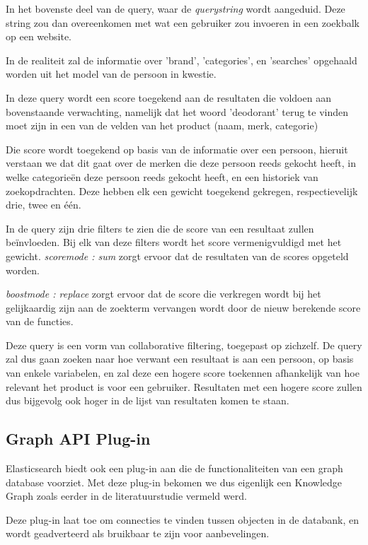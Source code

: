 In het bovenste deel van de query, waar de \textit{query\textunderscore string} wordt aangeduid. Deze string zou dan overeenkomen met wat een gebruiker zou invoeren in een zoekbalk op een website.

In de realiteit zal de informatie over 'brand', 'categories', en 'searches' opgehaald worden uit het model van de persoon in kwestie.

In deze query wordt een score toegekend aan de resultaten die voldoen aan bovenstaande verwachting, namelijk dat het woord 'deodorant' terug te vinden moet zijn in een van de velden van het product (naam, merk, categorie)

\newpage
Die score wordt toegekend op basis van de informatie over een persoon, hieruit verstaan we dat dit gaat over de merken die deze persoon reeds gekocht heeft, in welke categorieën deze persoon reeds gekocht heeft, en een historiek van zoekopdrachten. Deze hebben elk een gewicht toegekend gekregen, respectievelijk drie, twee en één. 

In de query zijn drie filters te zien die de score van een resultaat zullen beïnvloeden. Bij elk van deze filters wordt het score vermenigvuldigd met het gewicht. \textit{score\textunderscore mode : sum} zorgt ervoor dat de resultaten van de scores opgeteld worden.

\textit{boost\textunderscore mode : replace} zorgt ervoor dat de score die verkregen wordt bij het gelijkaardig zijn aan de zoekterm vervangen wordt door de nieuw berekende score van de functies.

Deze query is een vorm van collaborative filtering, toegepast op zichzelf. De query zal dus gaan zoeken naar hoe verwant een resultaat is aan een persoon, op basis van enkele variabelen, en zal deze een hogere score toekennen afhankelijk van hoe relevant het product is voor een gebruiker. Resultaten met een hogere score zullen dus bijgevolg ook hoger in de lijst van resultaten komen te staan.

\subsection{Graph API Plug-in}
\label{sec:Graph API Plug-in}

Elasticsearch biedt ook een plug-in aan die de functionaliteiten van een graph database voorziet. Met deze plug-in bekomen we dus eigenlijk een Knowledge Graph zoals eerder in de literatuurstudie vermeld werd. 

Deze plug-in laat toe om connecties te vinden tussen objecten in de databank, en wordt geadverteerd als bruikbaar te zijn voor aanbevelingen.

